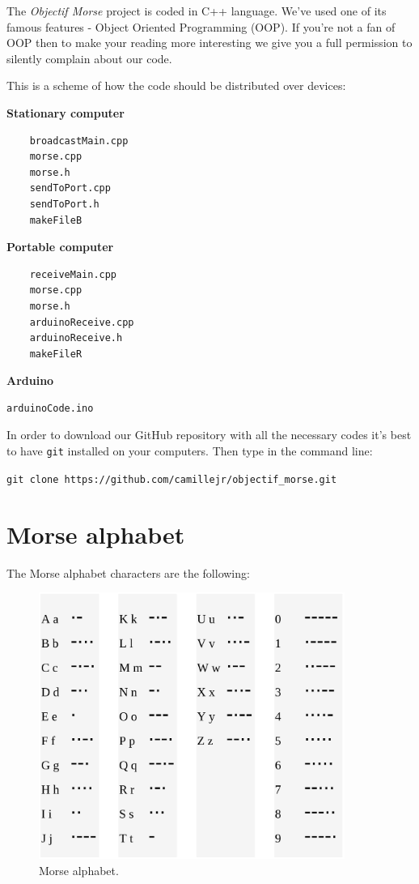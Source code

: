 \documentclass[12pt]{report}
\begin{document}
The \textit{Objectif Morse} project is coded in C++ language. We've used one of its famous features - Object Oriented Programming (OOP). If you're not a fan of OOP then to make your reading more interesting we give you a full permission to silently complain about our code.

This is a scheme of how the code should be distributed over devices:

\textbf{Stationary computer}

\begin{verbatim}
	broadcastMain.cpp
	morse.cpp
	morse.h
	sendToPort.cpp
	sendToPort.h
	makeFileB
\end{verbatim}

\textbf{Portable computer}

\begin{verbatim}
	receiveMain.cpp
	morse.cpp
	morse.h
	arduinoReceive.cpp
	arduinoReceive.h
	makeFileR
\end{verbatim}

\textbf{Arduino}

\begin{verbatim}
arduinoCode.ino
\end{verbatim}

In order to download our GitHub repository with all the necessary codes it's best to have \verb|git| installed on your computers. Then type in the command line:

\begin{snugshade}
\verb|git clone https://github.com/camillejr/objectif_morse.git|
\end{snugshade}

\newpage

\section{Morse alphabet}  \label{sec:morse}

The Morse alphabet characters are the following:

\begin{figure}[H]
\centering\includegraphics[width=10cm]{morse_alphabet}
\caption{Morse alphabet.}			
\label{fig:morse_alphabet}
\end{figure}
\end{document}
